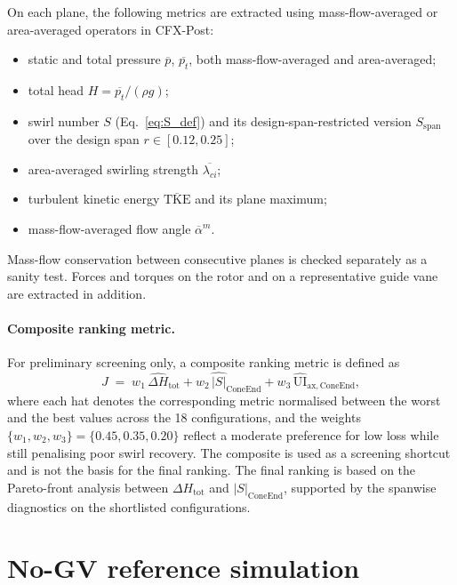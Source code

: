 On each plane, the following metrics are extracted using mass-flow-averaged or area-averaged operators in CFX-Post:
\begin{itemize}
  \item static and total pressure $\overline{p}$, $\overline{p_t}$, both mass-flow-averaged and area-averaged;
  \item total head $H = \overline{p_t}/(\rho g)$;
  \item swirl number $S$ (Eq.~\ref{eq:S_def}) and its design-span-restricted version $S_{\mathrm{span}}$ over the design span $r \in [0.12, 0.25]$;
  \item area-averaged swirling strength $\overline{\lambda_{ci}}$;
  \item turbulent kinetic energy $\overline{\mathrm{TKE}}$ and its plane maximum;
  \item mass-flow-averaged flow angle $\overline{\alpha}^{m}$.
\end{itemize}
Mass-flow conservation between consecutive planes is checked separately as a sanity test. Forces and torques on the rotor and on a representative guide vane are extracted in addition.
 
\paragraph{Composite ranking metric.}
For preliminary screening only, a composite ranking metric is defined as
\begin{equation}
J \;=\; w_1\,\widehat{\Delta H}_{\mathrm{tot}} + w_2\,\widehat{|S|}_{\mathrm{ConeEnd}} + w_3\,\widehat{\mathrm{UI}}_{\mathrm{ax,ConeEnd}},
\label{eq:composite}
\end{equation}
where each hat denotes the corresponding metric normalised between the worst and the best values across the 18 configurations, and the weights $\{w_1, w_2, w_3\} = \{0.45, 0.35, 0.20\}$ reflect a moderate preference for low loss while still penalising poor swirl recovery. The composite is used as a screening shortcut and is not the basis for the final ranking. The final ranking is based on the Pareto-front analysis between $\Delta H_{\mathrm{tot}}$ and $|S|_{\mathrm{ConeEnd}}$, supported by the spanwise diagnostics on the shortlisted configurations.
 
\section{No-GV reference simulation}
\label{sec:methods_rdt_baseline}
 
